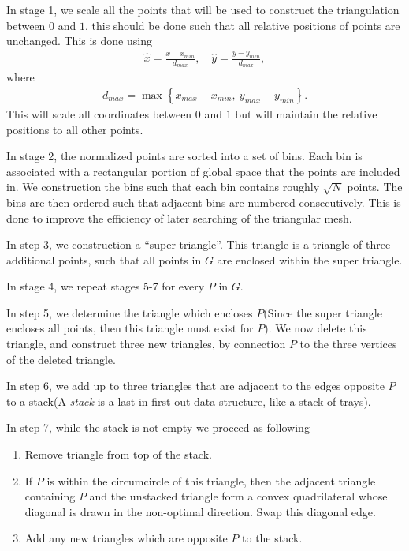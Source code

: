 \documentclass[../fem.tex]{subfiles}
\begin{document}
In stage 1, we scale all the points that will be used to construct the
triangulation between $0$ and $1$, this should be done such that all relative
positions of points are unchanged. This is done using
\begin{align*}
  \hat{x}=\frac{x-x_{min}}{d_{max}},\quad\hat{y}=\frac{y-y_{min}}{d_{max}},
\end{align*}
where
\begin{align*}
  d_{max}=\max\left\{x_{max}-x_{min},\ y_{max}-y_{min}\right\}.
\end{align*}
This will scale all coordinates between $0$ and $1$ but will maintain the
relative positions to all other points.

In stage 2, the normalized points are sorted into a set of bins. Each bin is
associated with a rectangular portion of global space that the points are
included in. We construction the bins such that each bin contains roughly
$\sqrt{N}$ points. The bins are then ordered such that adjacent bins are
numbered consecutively. This is done to improve the efficiency of later
searching of the triangular mesh.

In step 3, we construction a ``super triangle''. This triangle is a triangle of
three additional points, such that all points in $G$ are enclosed within the
super triangle.

In stage 4, we repeat stages 5-7 for every $P$ in $G$.

In step 5, we determine the triangle which encloses $P$(Since the super
triangle encloses all points, then this triangle must exist for $P$). We now
delete this triangle, and construct three new triangles, by connection $P$ to
the three vertices of the deleted triangle.

In step 6, we add up to three triangles that are adjacent to the edges opposite
$P$ to a stack(A \textit{stack} is a last in first out data structure, like a
stack of trays).

In step 7, while the stack is not empty we proceed as following

\begin{enumerate}[label=7.\arabic*.]
  \item Remove triangle from top of the stack.
  \item If $P$ is within the circumcircle of this triangle, then the adjacent
    triangle containing $P$ and the unstacked triangle form a convex
    quadrilateral whose diagonal is drawn in the non-optimal direction. Swap
    this diagonal edge.
  \item Add any new triangles which are opposite $P$ to the stack.
\end{enumerate}
\end{document}
